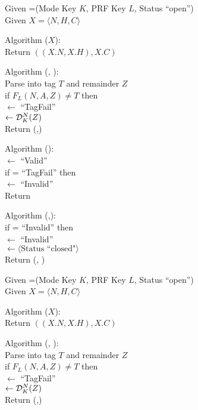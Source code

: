 \begin{figure}
{
Given =(Mode Key $K$, PRF Key $L$, Status
``open'') \\
Given $X=\langle N,H,C \rangle$

\medskip
Algorithm ($X$):\\
\nudge Return $\left((X.N,X.H),X.C\right)$

\medskip
Algorithm (, ):\\
\nudge Parse  into tag $T$ and remainder $Z$\\ 
\nudge if $F_L(N,A,Z) \neq T$ then\\
\nudge\nudge {} $\gets$ ``TagFail''\\
\nudge{} $\gets \mathcal{D}_K^{N}(Z)$\\
\nudge Return (,)

\medskip
Algorithm ():\\
\nudge {} $\gets$ ``Valid''\\
\nudge if  =  ``TagFail'' then\\ 
\nudge\nudge {} $\gets$ ``Invalid''\\
\nudge Return 

\medskip
Algorithm (,):\\
\nudge if  = ``Invalid'' then \\
\nudge\nudge {} $\gets$ ``Invalid'' \\
\nudge\nudge {} $\gets \langle
\mbox{Status ``closed"} \rangle$\\
\nudge Return (, )
}
{
Given =(Mode Key $K$, PRF Key $L$, Status
``open'') \\
Given $X=\langle N,H,C \rangle$

\medskip
Algorithm ($X$):\\
\nudge Return $\left((X.N, X.H),X.C\right)$

\medskip
Algorithm (, ):\\
\nudge Parse  into tag $T$ and remainder $Z$\\ 
\nudge if $F_L(N,A,Z) \neq T$ then\\
\nudge\nudge {} $\gets$ ``TagFail''\\
\nudge{} $\gets \mathcal{D}_K^{N}(Z)$\\
\nudge Return (,)

}
\end{figure}
